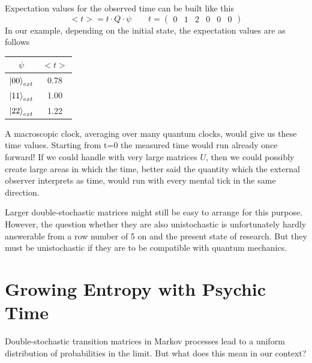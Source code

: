 \documentclass[12pt]{article}
\begin{document}
Expectation values for the observed time can be built like this
\begin{equation*}
<t> = t \cdot Q \cdot \psi \quad\quad t = \begin{pmatrix}
0&1&2&0&0&0
\end{pmatrix}
\end{equation*}
In our example, depending on the initial state, the expectation values are as follows
\begin{center}
\begin{tabular}{ |c|c| } 
 \hline
 $\psi$ & $<t>$ \\ 
 \hline
 $\ket{00}_{ext}$ & 0.78 \\ 
 $\ket{11}_{ext}$ & 1.00 \\ 
 $\ket{22}_{ext}$ & 1.22 \\
 \hline
\end{tabular}
\end{center}
A macroscopic clock, averaging over many quantum clocks, would give us these time values. Starting from t=0 the measured time would run already once forward! If we could handle with very large matrices $U$, then we could possibly create large areas in which the time, better said the quantity which the external observer interprets as time, would run with every mental tick in the same direction.

Larger double-stochastic matrices might still be easy to arrange for this purpose. However, the question whether they are also unistochastic is unfortunately hardly answerable from a row number of 5 on and the present state of research. But they must be unistochastic if they are to be compatible with quantum mechanics.

\section{Growing Entropy with Psychic Time}

Double-stochastic transition matrices in Markov processes lead to a uniform distribution of probabilities in the limit. But what does this mean in our context?

\end{document}
